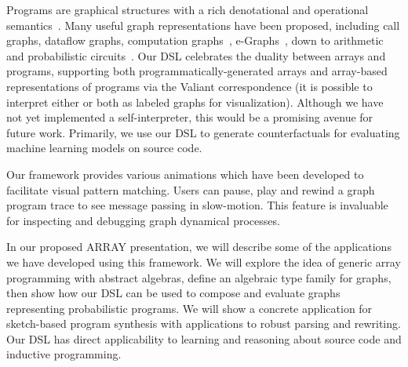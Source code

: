 \documentclass[sigplan,10pt,review,anonymous]{acmart}
\begin{document}
Programs are graphical structures with a rich denotational and operational semantics~\cite{henkel2018code}. Many useful graph representations have been proposed, including call graphs, dataflow graphs, computation graphs~\citep{breuleux2017automatic}, e-Graphs~\citep{willsey2020egg}, down to arithmetic~\citep{miller1988efficient} and probabilistic circuits~\citep{choi2020probabilistic}. Our DSL celebrates the duality between arrays and programs, supporting both programmatically-generated arrays and array-based representations of programs via the Valiant correspondence (it is possible to interpret either or both as labeled graphs for visualization). Although we have not yet implemented a self-interpreter, this would be a promising avenue for future work. Primarily, we use our DSL to generate counterfactuals for evaluating machine learning models on source code.

Our framework provides various animations which have been developed to facilitate visual pattern matching. Users can pause, play and rewind a graph program trace to see message passing in slow-motion. This feature is invaluable for inspecting and debugging graph dynamical processes.

In our proposed ARRAY presentation, we will describe some of the applications we have developed using this framework. We will explore the idea of generic array programming with abstract algebras, define an algebraic type family for graphs, then show how our DSL can be used to compose and evaluate graphs representing probabilistic programs. We will show a concrete application for sketch-based program synthesis with applications to robust parsing and rewriting. Our DSL has direct applicability to learning and reasoning about source code and inductive programming.








%
%
%
%
%
%
\end{document}
